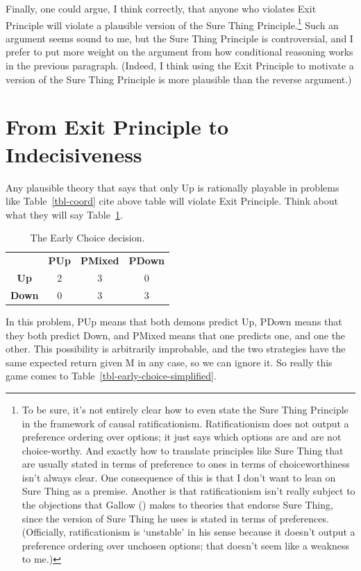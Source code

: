 \documentclass[
  12pt,
  letterpaper,
  DIV=11,
  numbers=noendperiod]{scrreprt}
\begin{document}
Finally, one could argue, I think correctly, that anyone who violates
Exit Principle will violate a plausible version of the Sure Thing
Principle.\footnote{To be sure, it's not entirely clear how to even
  state the Sure Thing Principle in the framework of causal
  ratificationism. Ratificationism does not output a preference ordering
  over options; it just says which options are and are not
  choice-worthy. And exactly how to translate principles like Sure Thing
  that are usually stated in terms of preference to ones in terms of
  choiceworthiness isn't always clear. One consequence of this is that I
  don't want to lean on Sure Thing as a premise. Another is that
  ratificationism isn't really subject to the objections that Gallow
  () makes to theories that endorse Sure
  Thing, since the version of Sure Thing he uses is stated in terms of
  preferences. (Officially, ratificationism is `unstable' in his sense
  because it doesn't output a preference ordering over unchosen options;
  that doesn't seem like a weakness to me.)} Such an argument seems
sound to me, but the Sure Thing Principle is controversial, and I prefer
to put more weight on the argument from how conditional reasoning works
in the previous paragraph. (Indeed, I think using the Exit Principle to
motivate a version of the Sure Thing Principle is more plausible than
the reverse argument.)

\section{From Exit Principle to
Indecisiveness}\label{sec-exit-to-indecisive}

Any plausible theory that says that only Up is rationally playable in
problems like Table~\ref{tbl-coord} cite above table will violate Exit
Principle. Think about what they will say Table~\ref{tbl-early-choice}.

\begin{longtable}[]{@{}cccc@{}}
\caption{The Early Choice
decision.}\label{tbl-early-choice}\tabularnewline
\toprule\noalign{}
\endfirsthead
\endhead
\bottomrule\noalign{}
\endlastfoot
& \textbf{PUp} & \textbf{PMixed} & \textbf{PDown} \\
\textbf{Up} & 2 & 3 & 0 \\
\textbf{Down} & 0 & 3 & 3 \\
\end{longtable}

In this problem, PUp means that both demons predict Up, PDown means that
they both predict Down, and PMixed means that one predicts one, and one
the other. This possibility is arbitrarily improbable, and the two
strategies have the same expected return given M in any case, so we can
ignore it. So really this game comes to
Table~\ref{tbl-early-choice-simplified}.
\end{document}
